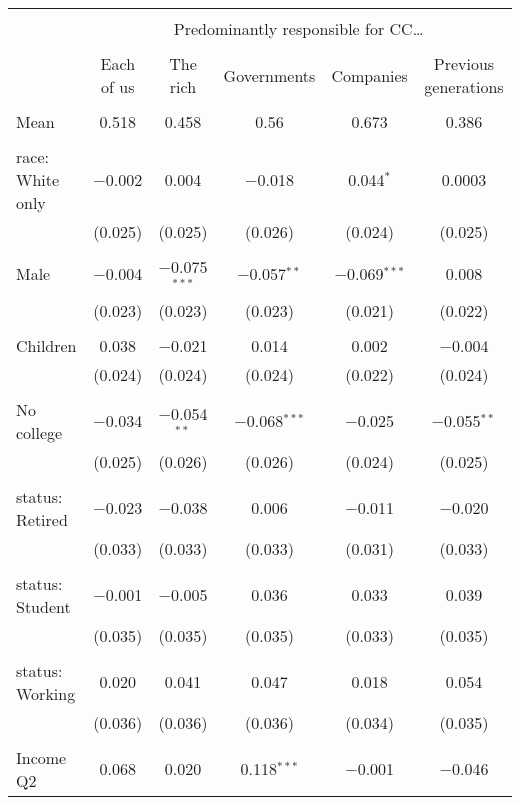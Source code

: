 
\begin{tabular}{@{\extracolsep{5pt}}lccccc} 
\\[-1.8ex]\hline 
\hline \\[-1.8ex] 
 & \multicolumn{5}{c}{Predominantly responsible for CC…} \\ 
\cline{2-6} 
\\[-1.8ex] & Each of us & The rich & Governments & Companies & Previous generations \\ 
\hline \\[-1.8ex] 
 Mean & 0.518 & 0.458 & 0.56 & 0.673 & 0.386  \\ \hline \\[-1.8ex] race: White only & $-$0.002 & 0.004 & $-$0.018 & 0.044$^{*}$ & 0.0003 \\ 
  & (0.025) & (0.025) & (0.026) & (0.024) & (0.025) \\ 
  & & & & & \\ 
 Male & $-$0.004 & $-$0.075$^{***}$ & $-$0.057$^{**}$ & $-$0.069$^{***}$ & 0.008 \\ 
  & (0.023) & (0.023) & (0.023) & (0.021) & (0.022) \\ 
  & & & & & \\ 
 Children & 0.038 & $-$0.021 & 0.014 & 0.002 & $-$0.004 \\ 
  & (0.024) & (0.024) & (0.024) & (0.022) & (0.024) \\ 
  & & & & & \\ 
 No college & $-$0.034 & $-$0.054$^{**}$ & $-$0.068$^{***}$ & $-$0.025 & $-$0.055$^{**}$ \\ 
  & (0.025) & (0.026) & (0.026) & (0.024) & (0.025) \\ 
  & & & & & \\ 
 status: Retired & $-$0.023 & $-$0.038 & 0.006 & $-$0.011 & $-$0.020 \\ 
  & (0.033) & (0.033) & (0.033) & (0.031) & (0.033) \\ 
  & & & & & \\ 
 status: Student & $-$0.001 & $-$0.005 & 0.036 & 0.033 & 0.039 \\ 
  & (0.035) & (0.035) & (0.035) & (0.033) & (0.035) \\ 
  & & & & & \\ 
 status: Working & 0.020 & 0.041 & 0.047 & 0.018 & 0.054 \\ 
  & (0.036) & (0.036) & (0.036) & (0.034) & (0.035) \\ 
  & & & & & \\ 
 Income Q2 & 0.068 & 0.020 & 0.118$^{***}$ & $-$0.001 & $-$0.046 \\ 

\end{tabular}

